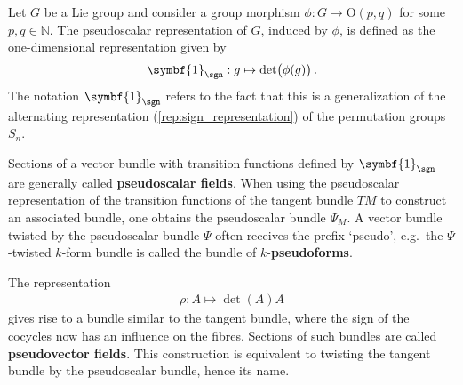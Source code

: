     \begin{example}[Pseudoscalars]
        Let $G$ be a Lie group and consider a group morphism $\phi:G\rightarrow\mathrm{O}(p,q)$ for some $p,q\in\mathbb{N}$. The pseudoscalar representation of $G$, induced by $\phi$, is defined as the one-dimensional representation given by
        \begin{gather}
            \symbf{1}_{\sgn}:g\mapsto\det\bigl(\phi(g)\bigr)\,.
        \end{gather}
        The notation $\symbf{1}_{\sgn}$ refers to the fact that this is a generalization of the alternating representation (\cref{rep:sign_representation}) of the permutation groups $S_n$.

        Sections of a vector bundle with transition functions defined by $\symbf{1}_{\sgn}$ are generally called \textbf{pseudoscalar fields}. When using the pseudoscalar representation of the transition functions of the tangent bundle $TM$ to construct an associated bundle, one obtains the pseudoscalar bundle $\Psi_M$. A vector bundle twisted by the pseudoscalar bundle $\Psi$ often receives the prefix `pseudo', e.g.~the $\Psi$-twisted $k$-form bundle is called the bundle of $k$-\textbf{pseudoforms}.
    \end{example}
    \begin{example}[Pseudovectors]
        The representation
        \begin{gather}
            \rho:A\mapsto\det(A)A
        \end{gather}
        gives rise to a bundle similar to the tangent bundle, where the sign of the cocycles now has an influence on the fibres. Sections of such bundles are called \textbf{pseudovector fields}. This construction is equivalent to twisting the tangent bundle by the pseudoscalar bundle, hence its name.
    \end{example}

